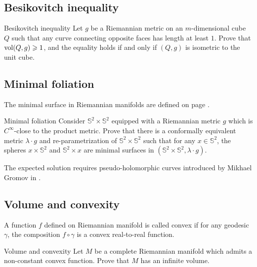 \subsection*{Besikovitch inequality}

\begin{pr}{}{Besikovitch inequality}
\label{Besikovitch inequality}
Let $g$ be a Riemannian metric on an $m$-dimensional cube $Q$ such that any curve connecting opposite faces has length at least $1$. 
Prove that $\operatorname{\rm vol}(Q,g)\geqslant 1$, 
and the equality holds if and only if $(Q,g)$ is isometric to the unit cube.
\end{pr}



\subsection*{Minimal foliation\thm}

The minimal surface in Riemannian manifolds are defined on page \pageref{minimal surface}.

\begin{pr}{\thm}{Minimal foliation}\label{gromomorphic-curves} 
Consider $\mathbb{S}^2\times \mathbb{S}^2$ equipped with a Riemannian metric $g$ 
which is $C^\infty$-close to the product metric. 
Prove that there is a conformally equivalent metric $\lambda\cdot g$ and re-parametrization of $\mathbb{S}^2\times \mathbb{S}^2$
such that for any $x\in \mathbb{S}^2$, the spheres $x\times\mathbb{S}^2$ and $\mathbb{S}^2\times x$ are minimal surfaces 
in $(\mathbb{S}^2\times \mathbb{S}^2,\lambda\cdot g)$.
\end{pr}


The expected solution requires pseudo-holomorphic curves introduced by Mikhael Gromov in \cite{gromov-pseudoholomorphic}.

\subsection*{Volume and convexity\thm}

A function $f$ defined on Riemannian manifold is called convex if for any geodesic $\gamma$, the composition $f\circ\gamma$ is a convex real-to-real function.

\begin{pr}{\thm}{Volume and convexity}
\label{Volume and convexity} 
Let
$M$ be a complete Riemannian manifold which admits a non-constant
convex function. 
Prove that $M$ has an infinite volume.
\end{pr}

